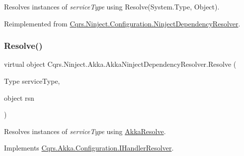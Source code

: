 Resolves instances of {\itshape service\+Type}  using Resolve(\+System.\+Type, Object). 



Reimplemented from \hyperlink{classCqrs_1_1Ninject_1_1Configuration_1_1NinjectDependencyResolver_ab9da7f1556cc1ef205d03d3ff62017c0_ab9da7f1556cc1ef205d03d3ff62017c0}{Cqrs.\+Ninject.\+Configuration.\+Ninject\+Dependency\+Resolver}.

\mbox{\label{classCqrs_1_1Ninject_1_1Akka_1_1AkkaNinjectDependencyResolver_ab860d9bcf44b62098a8df91bbcb5013d_ab860d9bcf44b62098a8df91bbcb5013d}} 
\subsubsection{\texorpdfstring{Resolve()}{Resolve()}\hspace{0.1cm}{\footnotesize\ttfamily [2/2]}}
{\footnotesize\ttfamily virtual object Cqrs.\+Ninject.\+Akka.\+Akka\+Ninject\+Dependency\+Resolver.\+Resolve (\begin{DoxyParamCaption}\item[{Type}]{service\+Type,  }\item[{object}]{rsn }\end{DoxyParamCaption})\hspace{0.3cm}{\ttfamily [virtual]}}



Resolves instances of {\itshape service\+Type}  using \hyperlink{classCqrs_1_1Ninject_1_1Akka_1_1AkkaNinjectDependencyResolver_a8e55618bf89a2c14bc3d0e7b3253f17d_a8e55618bf89a2c14bc3d0e7b3253f17d}{Akka\+Resolve}. 



Implements \hyperlink{interfaceCqrs_1_1Akka_1_1Configuration_1_1IHandlerResolver_abae10eed2d92eb3f2831c5eba7e3c2d3_abae10eed2d92eb3f2831c5eba7e3c2d3}{Cqrs.\+Akka.\+Configuration.\+I\+Handler\+Resolver}.

\mbox{\label{classCqrs_1_1Ninject_1_1Akka_1_1AkkaNinjectDependencyResolver_a6c3399c949a77457456d77688eb66054_a6c3399c949a77457456d77688eb66054}} 
